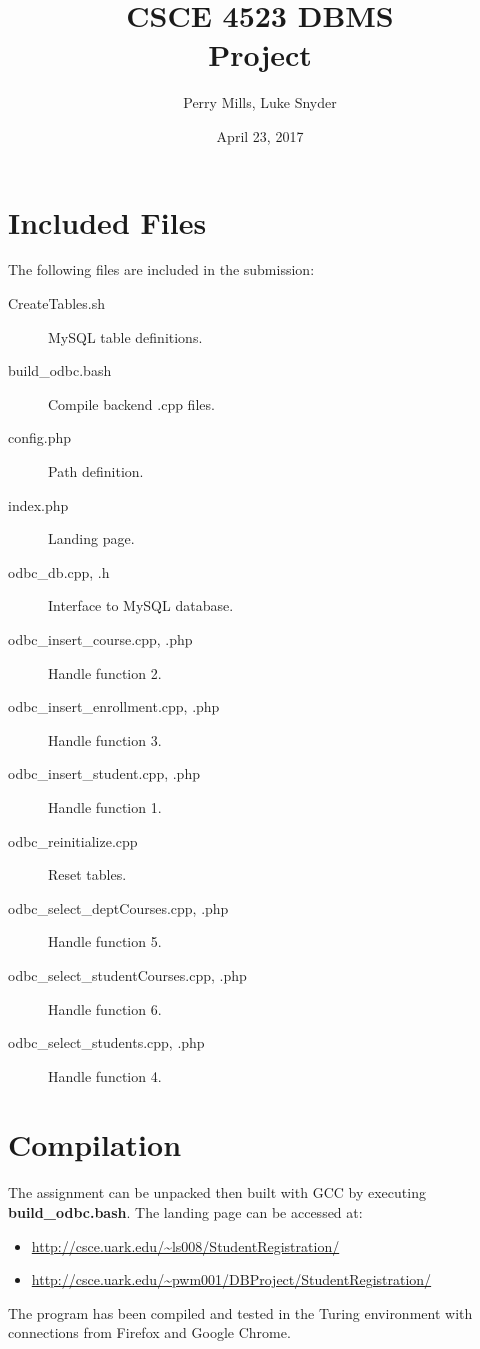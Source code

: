 \documentclass{article}      %
\title{CSCE 4523 DBMS \\
\large Project}  %
\author{Perry Mills, Luke Snyder}      %
\date{April 23, 2017}      %
\begin{document}

\maketitle                   %

\section*{Included Files}
The following files are included in the submission:
\begin{description}
\item [CreateTables.sh] MySQL table definitions.
\item [build\_odbc.bash] Compile backend .cpp files.
\item [config.php] Path definition.
\item [index.php] Landing page.
\item [odbc\_db.cpp, .h] Interface to MySQL database.
\item [odbc\_insert\_course.cpp, .php] Handle function 2.
\item [odbc\_insert\_enrollment.cpp, .php] Handle function 3.
\item [odbc\_insert\_student.cpp, .php] Handle function 1.
\item [odbc\_reinitialize.cpp] Reset tables.
\item [odbc\_select\_deptCourses.cpp, .php] Handle function 5.
\item [odbc\_select\_studentCourses.cpp, .php] Handle function 6.
\item [odbc\_select\_students.cpp, .php] Handle function 4.
\end{description}

\section*{Compilation}
The assignment can be unpacked then built with GCC by executing \textbf{build\_odbc.bash}.
The landing page can be accessed at:
\begin{itemize}
\item \url{http://csce.uark.edu/~ls008/StudentRegistration/}
\item \url{http://csce.uark.edu/~pwm001/DBProject/StudentRegistration/}
\end{itemize}
The program has been compiled and tested in the Turing environment with connections from
Firefox and Google Chrome.
\end{document}
